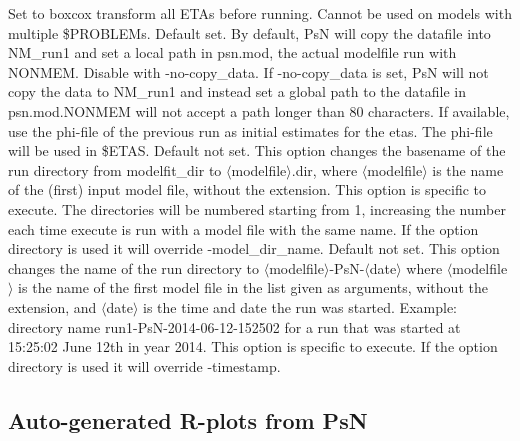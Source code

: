 \begin{optionlist}
Set to boxcox transform all ETAs before running. Cannot be used on models with multiple \$PROBLEMs.
\nextopt
{}
Default set.  By default, PsN will copy the datafile into NM\_run1 and set a local path in psn.mod, the actual modelfile run with NONMEM. Disable with -no-copy\_data. If -no-copy\_data is set, PsN will not copy the data to NM\_run1 and instead set a global path to the datafile in psn.mod.NONMEM will not accept a path longer than 80 characters.
\nextopt
{}
If available, use the phi-file of the previous run as initial estimates for the etas. The phi-file will be used in \$ETAS.
\nextopt
{}
Default not set. This option changes the basename of the run directory from modelfit\_dir to $\langle$modelfile$\rangle$.dir, where $\langle$modelfile$\rangle$ is the name of the (first) input model file, without the extension. This option is specific to execute.
The directories will be numbered starting from 1, increasing the number each time execute is run with a model file with the 
same name. If the option directory is used it will override -model\_dir\_name.
\nextopt
{}
Default not set. This option changes the name of the run directory to $\langle$modelfile$\rangle$-PsN-$\langle$date$\rangle$
where $\langle$modelfile$\rangle$ is the name of the first model file in the list given as arguments, without the extension,
and $\langle$date$\rangle$ is the time and date the run was started. 
Example: directory name run1-PsN-2014-06-12-152502 for a run that was started at 15:25:02 June 12th in year 2014.
This option is specific to execute.
If the option directory is used it will override -timestamp.
\nextopt
\end{optionlist}

\subsection{Auto-generated R-plots from PsN}
\newcommand{\rplotsconditions}{The default execute template 
requires the xpose4 R library. It also relies on Xpose-type tables being 
created, such as sdtab, patab and cotab, with the correct run number. 
See the Xpose documentation for requirements on such table files,
e.g. pages 106-108 in\\
\texttt{http://xpose.sourceforge.net/bestiarium\_v1.0.pdf}.\\
If option -subset\_variable\_rplots is used, 
the user must ensure that the subset variable
is printed to one of the xpose tables, for example sdtab, and then
there will be separate plots created for
subsets of the data, via xpose options 'subset' and 'by'. 
Xpose will treat the subset variable as continuous or categorical
based the number of unique values. The template contains 
a comment line with the xpose command for changing the default classification. 

If the conditions for creating the plots are not fulfilled then no pdf will be generated,
see the .Rout file in the main run directory for error messages.}


